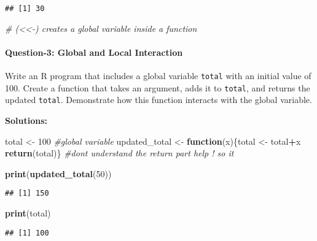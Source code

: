 \documentclass[
]{article}
\newenvironment{Shaded}{\begin{snugshade}}{\end{snugshade}}
\newcommand{\CommentTok}[1]{\textcolor[rgb]{0.56,0.35,0.01}{\textit{#1}}}
\newcommand{\ControlFlowTok}[1]{\textcolor[rgb]{0.13,0.29,0.53}{\textbf{#1}}}
\newcommand{\DecValTok}[1]{\textcolor[rgb]{0.00,0.00,0.81}{#1}}
\newcommand{\FunctionTok}[1]{\textcolor[rgb]{0.13,0.29,0.53}{\textbf{#1}}}
\newcommand{\NormalTok}[1]{#1}
\newcommand{\OtherTok}[1]{\textcolor[rgb]{0.56,0.35,0.01}{#1}}
\newcommand{\SpecialCharTok}[1]{\textcolor[rgb]{0.81,0.36,0.00}{\textbf{#1}}}
\begin{document}
\begin{verbatim}
## [1] 30
\end{verbatim}

\begin{Shaded}
\begin{Highlighting}[]
\CommentTok{\# (\textless{}\textless{}{-}) creates a global variable inside a function}
\end{Highlighting}
\end{Shaded}

\hypertarget{question-3-global-and-local-interaction}{%
\paragraph{Question-3: Global and Local
Interaction}\label{question-3-global-and-local-interaction}}

Write an R program that includes a global variable \texttt{total} with
an initial value of 100. Create a function that takes an argument, adds
it to \texttt{total}, and returns the updated \texttt{total}.
Demonstrate how this function interacts with the global variable.

\textbf{Solutions:}

\begin{Shaded}
\begin{Highlighting}[]
\NormalTok{total }\OtherTok{\textless{}{-}} \DecValTok{100} \CommentTok{\#global variable}
\NormalTok{updated\_total }\OtherTok{\textless{}{-}} \ControlFlowTok{function}\NormalTok{(x)\{total }\OtherTok{\textless{}{-}}\NormalTok{ total}\SpecialCharTok{+}\NormalTok{x }
\FunctionTok{return}\NormalTok{(total)\} }\CommentTok{\#dont understand the return part help ! so it }


\FunctionTok{print}\NormalTok{(}\FunctionTok{updated\_total}\NormalTok{(}\DecValTok{50}\NormalTok{))}
\end{Highlighting}
\end{Shaded}

\begin{verbatim}
## [1] 150
\end{verbatim}

\begin{Shaded}
\begin{Highlighting}[]
\FunctionTok{print}\NormalTok{(total)}
\end{Highlighting}
\end{Shaded}

\begin{verbatim}
## [1] 100
\end{verbatim}
\end{document}

